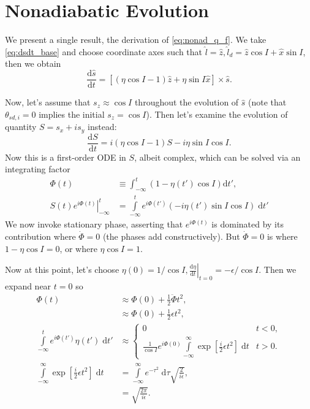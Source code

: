\documentclass[
        fleqn,
        usenatbib,
    ]{mnras}
\newcommand*{\rd}[2]{\frac{\mathrm{d}#1}{\mathrm{d}#2}}
\newcommand*{\at}[1]{\left.#1\right|}
\newcommand*{\p}[1]{\left(#1\right)}
\newcommand*{\s}[1]{\left[#1\right]}
\begin{document}
\section{Nonadiabatic Evolution}\label{s:nonad_app}

We present a single result, the derivation of \autoref{eq:nonad_q_f}. We take
\autoref{eq:dsdt_base} and choose coordinate axes such that $\hat{l} = \hat{z},
\hat{l}_d = \hat{z} \cos I + \hat{x}\sin I$, then we obtain
\begin{equation}
    \rd{\hat{s}}{t} = \s{
        \p{\eta \cos I - 1}\hat{z} + \eta \sin I \hat{x}} \times \hat{s}.
\end{equation}

Now, let's assume that $s_z \approx \cos I$ throughout the evolution of $\hat{s}$
(note that $\theta_{sd, i} = 0$ implies the initial $s_z = \cos I$). Then let's
examine the evolution of quantity $S = s_x + is_y$ instead:
\begin{equation}
    \rd{S}{t} = i\p{\eta\cos I - 1}S - i \eta \sin I\cos I.\label{eq:nonad_ode}
\end{equation}
Now this is a first-order ODE in $S$, albeit complex, which can be solved via
an integrating factor
\begin{align}
    \Phi(t) &\equiv \int_{-\infty}^t \p{1 - \eta(t') \cos I}
        \mathrm{d}t',\\
    \at{S(t) e^{i\Phi(t)}}_{-\infty}^t
        &= \int\limits_{-\infty}^t e^{i\Phi(t')}
            \p{-i\eta(t')\sin I\cos I}\;\mathrm{d}t'\label{eq:nonad_int}
\end{align}
We now invoke stationary phase, asserting that $e^{i\Phi(t)}$ is dominated by
its contribution where $\dot{\Phi} = 0$ (the phases add constructively). But
$\dot{\Phi} = 0$ is where $1 - \eta\cos I = 0$, or where $\eta\cos I = 1$.

Now at this point, let's choose $\eta(0) = 1/\cos I, \at{\rd{\eta}{t}}_{t=0} =
-\epsilon/\cos I$. Then we expand near $t = 0$ so
\begin{align*}
    \Phi(t) &\approx \Phi(0) + \frac{1}{2}\ddot{\Phi}t^2,\\
        &\approx \Phi(0) + \frac{1}{2}\epsilon t^2,\\
    \int\limits_{-\infty}^t e^{i\Phi(t')}\eta(t')\;\mathrm{d}t'
        &\approx
        \begin{cases}
            0 & t < 0,\\
            \frac{1}{\cos I}e^{i\Phi(0)}\int\limits_{-\infty}^\infty
                \exp\s{\frac{i}{2}\epsilon t^2}\;\mathrm{d}t
                & t > 0.
        \end{cases}\\
    \int\limits_{-\infty}^\infty
                \exp\s{\frac{i}{2}\epsilon t^2}\;\mathrm{d}t
        &= \int\limits_{-\infty}^\infty e^{-\tau^2}\;\mathrm{d}\tau
            \sqrt{\frac{2}{i\epsilon}},\\
        &= \sqrt{\frac{2\pi}{i\epsilon}}.
\end{align*}
\end{document}
